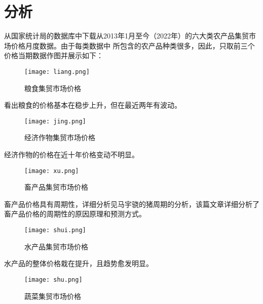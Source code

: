 \documentclass[a4paper,AutoFakeBold,AutoFakeSlant]{ctexart}
\begin{document}
\section{分析}
从国家统计局的数据库中下载从2013年1月至今（2022年）的六大类农产品集贸市场价格月度数据\cite{数据}。由于每类数据中
所包含的农产品种类很多，因此，只取前三个价格当期数据作图并展示如下：

\begin{figure}[H]
  \centering
  \texttt{[image: liang.png]}
  \caption{粮食集贸市场价格}
  \label{f1}
\end{figure}

看出粮食的价格基本在稳步上升，但在最近两年有波动。

\begin{figure}[H]
  \centering
  \texttt{[image: jing.png]}
  \caption{经济作物集贸市场价格}
  \label{f2}
\end{figure}

经济作物的价格在近十年价格变动不明显。

\begin{figure}[H]
  \centering
  \texttt{[image: xu.png]}
  \caption{畜产品集贸市场价格}
  \label{f3}
\end{figure}

畜产品价格具有周期性，详细分析见马宇骁的猪周期的分析\cite{数学建模HW2实验报告}，该篇文章详细分析了
畜产品价格的周期性的原因原理和预测方式。

\begin{figure}[H]
  \centering
  \texttt{[image: shui.png]}
  \caption{水产品集贸市场价格}
  \label{f4}
\end{figure}

水产品的整体价格栽在提升，且趋势愈发明显。

\begin{figure}[H]
  \centering
  \texttt{[image: shu.png]}
  \caption{蔬菜集贸市场价格}
  \label{f5}
\end{figure}
\end{document}
